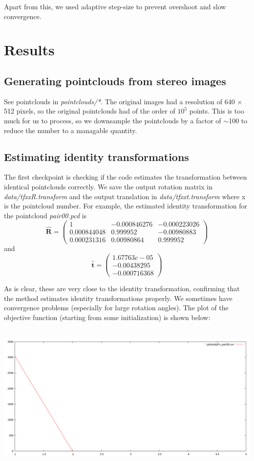 \documentclass[11pt, a4paper]{article}
\begin{document}
\noindent Apart from this, we used adaptive step-size to prevent overshoot and slow convergence.

\section{Results}
\subsection{Generating pointclouds from stereo images}
See pointclouds in \textit{pointclouds/*}. The original images had a resolution of 640 $\times$ 512 pixels, so the original pointclouds had of the order of $10^5$ points. This is too much for us to process, so we downsample the pointclouds by a factor of $\sim$100 to reduce the number to a managable quantity.

\subsection{Estimating identity transformations}
The first checkpoint is checking if the code estimates the transformation between identical pointclouds correctly. We save the output rotation matrix in \textit{data/tfxxR.transform} and the output translation in \textit{data/tfxxt.transform} where x is the pointcloud number. For example, the estimated identity transformation for the pointcloud \textit{pair00.pcd} is $$\hat{\textbf{R}} = \begin{pmatrix}
  1 & -0.000846276 & -0.000223026 \\
  0.000844048 & 0.999952 & -0.00980883 \\
  0.000231316 & 0.00980864 & 0.999952
 \end{pmatrix}$$ and $$\hat{\textbf{t}} = \begin{pmatrix}
 1.67763e-05 \\
 -0.00438295 \\
 -0.000716368
 \end{pmatrix}$$

\noindent As is clear, these are very close to the identity transformation, confirming that the method estimates identity transformations properly. We sometimes have convergence problems (especially for large rotation angles). The plot of the objective function (starting from some initialization) is shown below: \\ \\
\centerline{\includegraphics[scale=0.35]{objFn_pair00}}
\end{document}

